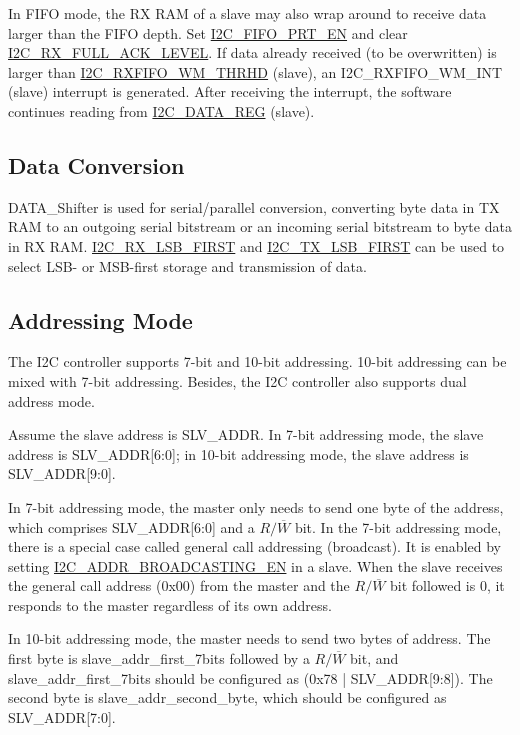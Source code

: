 \documentclass[main\_\_EN.tex]{subfiles}
\begin{document}
In FIFO mode, the RX RAM of a slave may also wrap around to receive data larger than the FIFO depth. Set \hyperref[fielddesc:I2CFIFOPRTEN]{I2C\_FIFO\_PRT\_EN} and clear \hyperref[fielddesc:I2CRXFULLACKLEVEL]{I2C\_RX\_FULL\_ACK\_LEVEL}. If data already received (to be overwritten) is larger than \hyperref[fielddesc:I2CRXFIFOWMTHRHD]{I2C\_RXFIFO\_WM\_THRHD} (slave), an I2C\_RXFIFO\_WM\_INT (slave) interrupt is generated. After receiving the interrupt, the software continues reading from \hyperref[regdesc:I2CDATAREG]{I2C\_DATA\_REG} (slave).

\subsection{Data Conversion}
DATA\_Shifter is used for serial/parallel conversion, converting byte data in TX RAM to an outgoing serial bitstream or an incoming serial bitstream to byte data in RX RAM. \hyperref[fielddesc:I2CRXLSBFIRST]{I2C\_RX\_LSB\_FIRST} and \hyperref[fielddesc:I2CTXLSBFIRST]{I2C\_TX\_LSB\_FIRST} can be used to select LSB- or MSB-first storage and transmission of data.

\subsection{Addressing Mode}
The \chipname{} I2C controller supports 7-bit and 10-bit addressing. 10-bit addressing can be mixed with 7-bit addressing. Besides, the \chipname{} I2C controller also supports dual address mode.

Assume the slave address is SLV\_ADDR. In 7-bit addressing mode, the slave address is SLV\_ADDR[6:0]; in 10-bit addressing mode, the slave address is SLV\_ADDR[9:0].

In 7-bit addressing mode, the master only needs to send one byte of the address, which comprises SLV\_ADDR[6:0] and a $R/\overline W$ bit. In the 7-bit addressing mode, there is a special case called general call addressing (broadcast). It is enabled by setting \hyperref[fielddesc:I2CADDRBROADCASTINGEN]{I2C\_ADDR\_BROADCASTING\_EN} in a slave. When the slave receives the general call address (0x00) from the master and the $R/\overline W$ bit followed is 0, it responds to the master regardless of its own address.

In 10-bit addressing mode, the master needs to send two bytes of address. The first byte is slave\_addr\_first\_7bits followed by a $R/\overline W$ bit, and slave\_addr\_first\_7bits should be configured as (0x78 | SLV\_ADDR[9:8]). The second byte is slave\_addr\_second\_byte, which should be configured as SLV\_ADDR[7:0]. 
\end{document}
